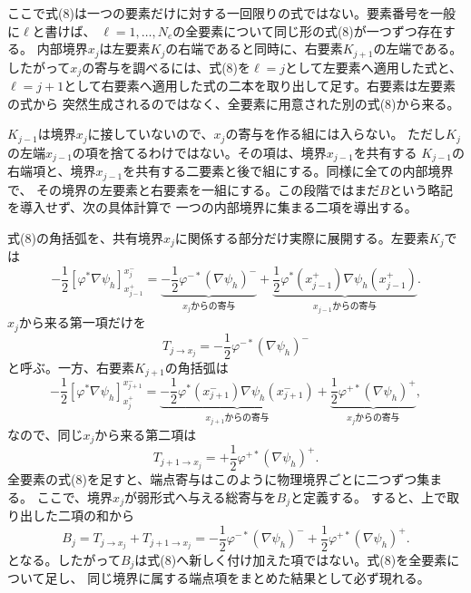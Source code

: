 \documentclass[11pt,a4paper]{article}
\begin{document}
ここで式(8)は一つの要素だけに対する一回限りの式ではない。要素番号を一般に$\ell$と書けば、
$\ell=1,\ldots,N_e$の全要素について同じ形の式(8)が一つずつ存在する。
内部境界$x_j$は左要素$K_j$の右端であると同時に、右要素$K_{j+1}$の左端である。
したがって$x_j$の寄与を調べるには、式(8)を$\ell=j$として左要素へ適用した式と、
$\ell=j+1$として右要素へ適用した式の二本を取り出して足す。右要素は左要素の式から
突然生成されるのではなく、全要素に用意された別の式(8)から来る。

$K_{j-1}$は境界$x_j$に接していないので、$x_j$の寄与を作る組には入らない。
ただし$K_j$の左端$x_{j-1}$の項を捨てるわけではない。その項は、境界$x_{j-1}$を共有する
$K_{j-1}$の右端項と、境界$x_{j-1}$を共有する二要素と後で組にする。同様に全ての内部境界で、
その境界の左要素と右要素を一組にする。この段階ではまだ$B$という略記を導入せず、次の具体計算で
一つの内部境界に集まる二項を導出する。

式(8)の角括弧を、共有境界$x_j$に関係する部分だけ実際に展開する。左要素$K_j$では
\begin{equation}
 -\frac12\left[\varphi^*\nabla\psi_h\right]_{x_{j-1}^+}^{x_j^-}
 =\underbrace{-\frac12\varphi^{-*}(\nabla\psi_h)^-}_{x_j\text{からの寄与}}
 +\underbrace{\frac12\varphi^*(x_{j-1}^+)\nabla\psi_h(x_{j-1}^+)}_{x_{j-1}\text{からの寄与}}.
\end{equation}
$x_j$から来る第一項だけを
\begin{equation}
 T_{j\to x_j}=-\frac12\varphi^{-*}(\nabla\psi_h)^-
 \label{eq:left-element-interface-piece}
\end{equation}
と呼ぶ。一方、右要素$K_{j+1}$の角括弧は
\begin{equation}
 -\frac12\left[\varphi^*\nabla\psi_h\right]_{x_j^+}^{x_{j+1}^-}
 =\underbrace{-\frac12\varphi^*(x_{j+1}^-)\nabla\psi_h(x_{j+1}^-)}_{x_{j+1}\text{からの寄与}}
 +\underbrace{\frac12\varphi^{+*}(\nabla\psi_h)^+}_{x_j\text{からの寄与}},
\end{equation}
なので、同じ$x_j$から来る第二項は
\begin{equation}
 T_{j+1\to x_j}=+\frac12\varphi^{+*}(\nabla\psi_h)^+.
 \label{eq:right-element-interface-piece}
\end{equation}
全要素の式(8)を足すと、端点寄与はこのように物理境界ごとに二つずつ集まる。
ここで、境界$x_j$が弱形式へ与える総寄与を$B_j$と定義する。
すると、上で取り出した二項の和から
\begin{equation}
 B_j=T_{j\to x_j}+T_{j+1\to x_j}
 =-\frac12\varphi^{-*}(\nabla\psi_h)^-
  +\frac12\varphi^{+*}(\nabla\psi_h)^+.
 \label{eq:boundary-sum-derived}
\end{equation}
となる。したがって$B_j$は式(8)へ新しく付け加えた項ではない。式(8)を全要素について足し、
同じ境界に属する端点項をまとめた結果として必ず現れる。
\end{document}
